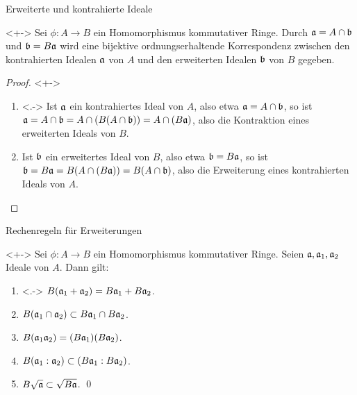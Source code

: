 \begin{frame}{Erweiterte und kontrahierte Ideale}
	\begin{proposition}<+->
		Sei \(\phi\colon A \to B\) ein Homomorphismus kommutativer Ringe.
		Durch \(\mathfrak{a} = A \cap \mathfrak{b}\) und \(\mathfrak{b} = B \mathfrak{a}\) wird
		eine bijektive ordnungserhaltende Korrespondenz zwischen den kontrahierten
		Idealen \(\mathfrak{a}\) von \(A\) und den erweiterten Idealen \(\mathfrak{b}\)
		von \(B\) gegeben.
	\end{proposition}
	\begin{proof}<+->
		\begin{enumerate}[<+->]
		\item<.->
			Ist \(\mathfrak{a}\) ein kontrahiertes Ideal von \(A\), also etwa
			\(\mathfrak{a} = A \cap \mathfrak{b}\), so ist \(\mathfrak{a} = 
			A \cap \mathfrak{b} = A \cap (B (A \cap \mathfrak{b})) = A \cap
			(B \mathfrak{a})\), also die Kontraktion
			eines erweiterten Ideals von \(B\).
		\item
			Ist \(\mathfrak{b}\) ein erweitertes Ideal von \(B\), also etwa
			\(\mathfrak{b} = B \mathfrak{a}\), so ist \(\mathfrak{b} = B \mathfrak{a}
			= B (A \cap (B \mathfrak{a})) = B (A \cap \mathfrak{b})\),
			also die Erweiterung eines kontrahierten
			Ideals von \(A\).
			\qedhere
		\end{enumerate}
	\end{proof}
\end{frame}

\begin{frame}{Rechenregeln für Erweiterungen}
	\begin{proposition}<+->
		Sei \(\phi\colon A \to B\) ein Homomorphismus kommutativer Ringe.
		Seien \(\mathfrak{a}, \mathfrak{a}_1,
		\mathfrak{a}_2\) Ideale von \(A\). Dann gilt:
		\begin{enumerate}[<+->]
		\item<.->
			\(B(\mathfrak{a}_1 + \mathfrak{a}_2) = B \mathfrak{a}_1 + B \mathfrak{a}_2\).
		\item
		    \(B(\mathfrak{a}_1 \cap \mathfrak{a}_2) \subset B \mathfrak{a}_1 \cap
		    B \mathfrak{a}_2\).
		\item
		    \(B(\mathfrak{a}_1 \mathfrak{a}_2) = (B \mathfrak{a}_1) (B \mathfrak{a}_2)\).
		\item
		    \(B(\mathfrak{a}_1 : \mathfrak{a}_2) \subset (B \mathfrak{a}_1 : B \mathfrak{a}_2)\).
		\item
		    \(B \sqrt{\mathfrak{a}} \subset \sqrt{B \mathfrak{a}}\).
		    \qed
		\end{enumerate}
	\end{proposition}
\end{frame}

